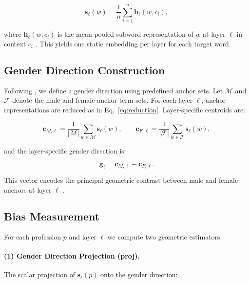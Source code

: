 \documentclass[10pt]{article}
\begin{document}
\begin{equation}
  \mathbf{s}_{\ell}(w)
  =
  \frac{1}{n}
  \sum_{i=1}^{n}
  \mathbf{h}_{\ell}(w, c_i),
  \label{eq:reduction}
\end{equation}

where $\mathbf{h}_{\ell}(w, c_i)$ is the mean-pooled subword representation
of $w$ at layer $\ell$ in context $c_i$ \citep{bommasani2020reductions}.
This yields one static embedding per layer for each target word.

\subsection{Gender Direction Construction}

Following \citet{bolukbasi2016man}, we define a gender direction using
predefined anchor sets. Let $\mathcal{M}$ and $\mathcal{F}$ denote the
male and female anchor term sets. For each layer $\ell$, anchor
representations are reduced as in Eq.~\eqref{eq:reduction}.
Layer-specific centroids are:

\begin{equation}
  \mathbf{c}_{M,\ell}
  =
  \frac{1}{|\mathcal{M}|}
  \sum_{w \in \mathcal{M}}
  \mathbf{s}_{\ell}(w),
  \qquad
  \mathbf{c}_{F,\ell}
  =
  \frac{1}{|\mathcal{F}|}
  \sum_{w \in \mathcal{F}}
  \mathbf{s}_{\ell}(w),
\end{equation}

and the layer-specific gender direction is:

\begin{equation}
  \mathbf{g}_{\ell}
  =
  \mathbf{c}_{M,\ell} - \mathbf{c}_{F,\ell}.
\end{equation}

This vector encodes the principal geometric contrast between male and female
anchors at layer $\ell$ \citep{bolukbasi2016man}.

\subsection{Bias Measurement}

For each profession $p$ and layer $\ell$ we compute two geometric estimators.

\paragraph{(1) Gender Direction Projection (proj).}

The scalar projection of $\mathbf{s}_{\ell}(p)$ onto the gender direction:
\end{document}
